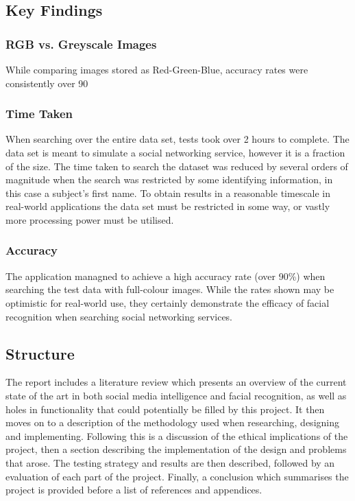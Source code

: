 \documentclass[12pt]{article}
\begin{document}
\subsection{Key Findings}
\subsubsection{RGB vs. Greyscale Images}
While comparing images stored as Red-Green-Blue, accuracy rates were consistently over 90%

\subsubsection{Time Taken}
When searching over the entire data set, tests took over 2 hours to complete. The data set is meant to simulate a social networking service, however it is a fraction of the size. The time taken to search the dataset was reduced by several orders of magnitude when the search was restricted by some identifying information, in this case a subject's first name. To obtain results in a reasonable timescale in real-world applications the data set must be restricted in some way, or vastly more processing power must be utilised.

\subsubsection{Accuracy}
The application managned to achieve a high accuracy rate (over 90\%) when searching the test data with full-colour images. While the rates shown may be optimistic for real-world use, they certainly demonstrate the efficacy of facial recognition when searching social networking services.

\subsection{Structure}
The report includes a literature review which presents an overview of the current state of the art in both social media intelligence and facial recognition, as well as holes in functionality that could potentially be filled by this project. It then moves on to a description of the methodology used when researching, designing and implementing. Following this is a discussion of the ethical implications of the project, then a section describing the implementation of the design and problems that arose. The testing strategy and results are then described, followed by an evaluation of each part of the project. Finally, a conclusion which summarises the project is provided before a list of references and appendices.
\end{document}
